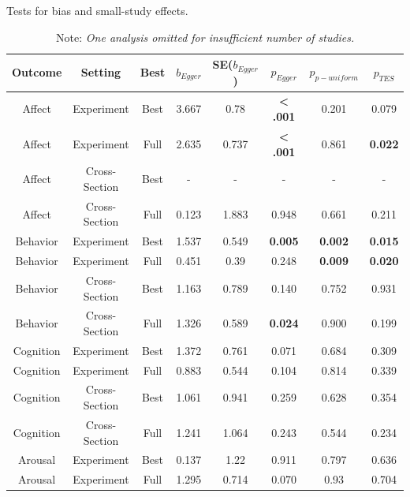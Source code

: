 \documentclass[man, mask]{apa6}
\begin{document}
\begin{table}[htbp]
	\centering
	\caption{Tests for bias and small-study effects.}
	\begin{tabular}{cccccccc}
		\toprule
		Outcome & Setting & Best  & $b_{Egger}$ & SE($b_{Egger}$) & $p_{Egger}$ & $p_{p-uniform}$ & $p_{TES}$ \\
		\midrule
		Affect & Experiment & Best  & 3.667 & 0.78  & \textbf{< .001} & 0.201 & 0.079 \\
		Affect & Experiment & Full  & 2.635 & 0.737 & \textbf{< .001} & 0.861 & \textbf{0.022} \\
		Affect & Cross-Section & Best  & -     & -     & -     & -     & - \\
		Affect & Cross-Section & Full  & 0.123 & 1.883 & 0.948 & 0.661 & 0.211 \\
		Behavior & Experiment & Best  & 1.537 & 0.549 & \textbf{0.005} & \textbf{0.002} & \textbf{0.015} \\
		Behavior & Experiment & Full  & 0.451 & 0.39  & 0.248 & \textbf{0.009} & \textbf{0.020} \\
		Behavior & Cross-Section & Best  & 1.163 & 0.789 & 0.140  & 0.752 & 0.931 \\
		Behavior & Cross-Section & Full  & 1.326 & 0.589 & \textbf{0.024} & 0.900   & 0.199 \\
		Cognition & Experiment & Best  & 1.372 & 0.761 & 0.071 & 0.684 & 0.309 \\
		Cognition & Experiment & Full  & 0.883 & 0.544 & 0.104 & 0.814 & 0.339 \\
		Cognition & Cross-Section & Best  & 1.061 & 0.941 & 0.259 & 0.628 & 0.354 \\
		Cognition & Cross-Section & Full  & 1.241 & 1.064 & 0.243 & 0.544 & 0.234 \\
		Arousal & Experiment & Best  & 0.137 & 1.22  & 0.911 & 0.797 & 0.636 \\
		Arousal & Experiment & Full  & 1.295 & 0.714 & 0.070  & 0.93  & 0.704 \\
		\bottomrule
	\end{tabular}%
	\label{table:Egger}%
	\caption*{Note: {\em One analysis omitted for insufficient number of studies.
			}}
\end{table}%
\end{document}
